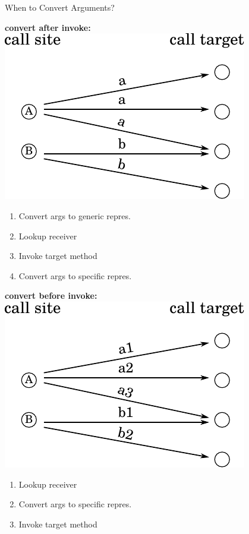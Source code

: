 \documentclass[xcolor=dvipsname]{beamer} %
\begin{document}
\begin{frame}{When to Convert Arguments?}
\begin{minipage}{0.49\textwidth}
\begin{table}
\centering
\textbf{convert after invoke:} \newline \newline
\includegraphics[width=0.8\textwidth]{pic_regular.pdf}
\end{table}
\begin{enumerate}
	\item Convert args to generic repres.
	\item Lookup receiver
	\item Invoke target method
	\item Convert args to specific repres.
\end{enumerate}
\end{minipage} %
\begin{minipage}{0.49\textwidth}
\begin{table}
\centering
\textbf{convert before invoke:} \newline \newline
\includegraphics[width=0.8\textwidth]{pic_calltarget.pdf}
\end{table}
\begin{enumerate}
	\item Lookup receiver
	\item Convert args to specific repres.
	\item Invoke target method
\end{enumerate}
\end{minipage}
\end{frame}
\end{document}
